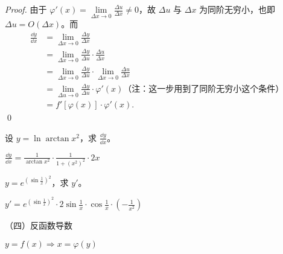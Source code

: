     \begin{proof}
        由于 $\varphi'(x)=\lim\limits_{\Delta x \to 0}\displaystyle\frac{\Delta u}{\Delta x}\neq 0$，故 $\Delta u$ 与 $\Delta x$ 为同阶无穷小，也即 $\Delta u = O(\Delta x)$。而 
        \begin{align*}
        \displaystyle\frac{\dd{y}}{\dd{x}} &= \lim\limits_{\Delta x \to 0}\displaystyle\frac{\Delta y}{\Delta x}\\
        &=\lim\limits_{\Delta x \to 0}\displaystyle\frac{\Delta y}{\Delta u} \cdot \displaystyle\frac{\Delta u}{\Delta x}\\
        &=\lim\limits_{\Delta x \to 0}\displaystyle\frac{\Delta y}{\Delta u} \cdot \lim\limits_{\Delta x \to 0}\displaystyle\frac{\Delta u}{\Delta x}\\
        &=\lim\limits_{\Delta u \to 0}\displaystyle\frac{\Delta y}{\Delta u} \cdot \varphi'(x) \text{（注：这一步用到了同阶无穷小这个条件）}\\
        &=f'[\varphi(x)]\cdot\varphi'(x). 
        \end{align*}
        \qed
    \end{proof}

    \begin{example}
        设 $y = \ln\arctan x^2$，求 $\displaystyle\frac{\dd{y}}{\dd{x}}$。
    \end{example}

    \begin{solution}
        $\displaystyle\frac{\dd{y}}{\dd{x}} = \displaystyle\frac{1}{\arctan x^2}\cdot \displaystyle\frac{1}{1+(x^2)^2}\cdot 2x$
    \end{solution}

    \begin{example}
        $ y = e^{(\sin{\frac{1}{x}})^2}$，求 $y'$。
    \end{example}

    \begin{solution}
        $ y' = e^{(\sin{\frac{1}{x}})^2}\cdot 2\sin{\frac{1}{x}}\cdot \cos{\frac{1}{x}} \cdot (-\frac{1}{x^2})$
    \end{solution}

    （四）反函数导数
    
    $ y = f(x) \Rightarrow  x = \varphi(y)$
 






